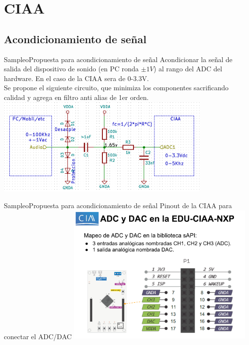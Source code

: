  \section{CIAA}
 \subsection{Acondicionamiento de señal}
 \begin{frame}{Sampleo}{Propuesta para acondicionamiento de señal}
    Acondicionar la señal de salida del dispositivo de sonido (en PC ronda $\pm1V$) al rango del ADC del hardware. En el caso de la CIAA sera de 0-3.3V. \\ 
    Se propone el siguiente circuito, que minimiza los componentes sacrificando calidad y agrega en filtro anti alias de 1er orden.
    \protoboardicon
    \center\includegraphics[width=0.8\textwidth]{1_clase/circuito}
    \vfill
 \end{frame}
 \begin{frame}{Sampleo}{Propuesta para acondicionamiento de señal}
    Pinout de la CIAA para conectar el ADC/DAC
    \protoboardicon
    \center\includegraphics[width=0.7\textwidth]{1_clase/adc_dac_pins}
    \vfill
 \end{frame}
